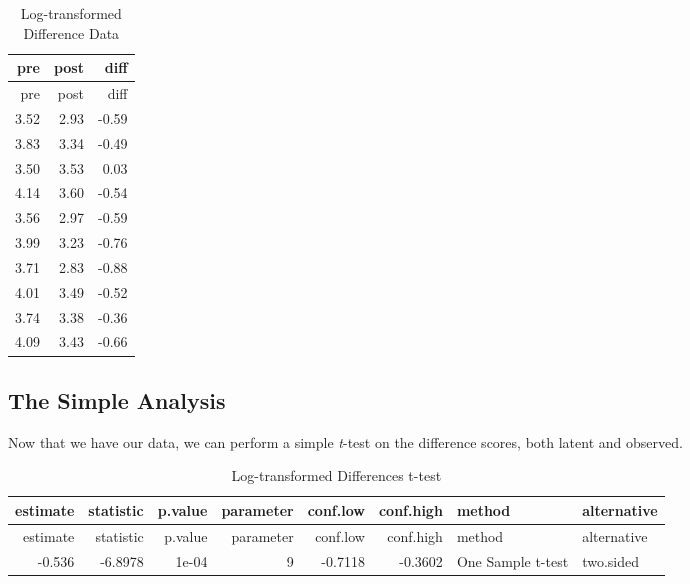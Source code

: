 \documentclass[]{tufte-handout}
\newenvironment{Shaded}{}{}
\newcommand{\DataTypeTok}[1]{\textcolor[rgb]{0.56,0.13,0.00}{#1}}
\newcommand{\DecValTok}[1]{\textcolor[rgb]{0.25,0.63,0.44}{#1}}
\newcommand{\KeywordTok}[1]{\textcolor[rgb]{0.00,0.44,0.13}{\textbf{#1}}}
\newcommand{\NormalTok}[1]{#1}
\newcommand{\OperatorTok}[1]{\textcolor[rgb]{0.40,0.40,0.40}{#1}}
\newcommand{\StringTok}[1]{\textcolor[rgb]{0.25,0.44,0.63}{#1}}
\begin{document}
\begin{longtable}[]{@{}rrr@{}}
\caption{Log-transformed Difference Data}\tabularnewline
\toprule
pre & post & diff\tabularnewline
\midrule
\endfirsthead
\toprule
pre & post & diff\tabularnewline
\midrule
\endhead
3.52 & 2.93 & -0.59\tabularnewline
3.83 & 3.34 & -0.49\tabularnewline
3.50 & 3.53 & 0.03\tabularnewline
4.14 & 3.60 & -0.54\tabularnewline
3.56 & 2.97 & -0.59\tabularnewline
3.99 & 3.23 & -0.76\tabularnewline
3.71 & 2.83 & -0.88\tabularnewline
4.01 & 3.49 & -0.52\tabularnewline
3.74 & 3.38 & -0.36\tabularnewline
4.09 & 3.43 & -0.66\tabularnewline
\bottomrule
\end{longtable}

\hypertarget{the-simple-analysis-1}{%
\subsection{The Simple Analysis}\label{the-simple-analysis-1}}

Now that we have our data, we can perform a simple \emph{t}-test on the
difference scores, both latent and observed.

\begin{Shaded}
\end{Shaded}

\begin{longtable}[]{@{}rrrrrrll@{}}
\caption{Log-transformed Differences t-test}\tabularnewline
\toprule
estimate & statistic & p.value & parameter & conf.low & conf.high &
method & alternative\tabularnewline
\midrule
\endfirsthead
\toprule
estimate & statistic & p.value & parameter & conf.low & conf.high &
method & alternative\tabularnewline
\midrule
\endhead
-0.536 & -6.8978 & 1e-04 & 9 & -0.7118 & -0.3602 & One Sample t-test &
two.sided\tabularnewline
\bottomrule
\end{longtable}

\begin{Shaded}
\end{Shaded}
\end{document}
